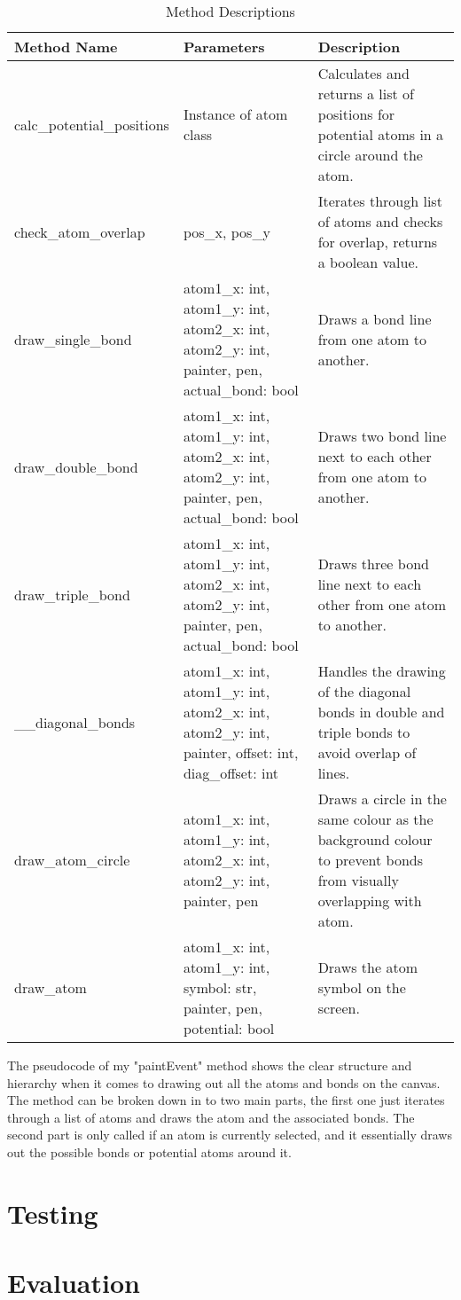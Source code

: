 \documentclass[a4paper,12pt]{article}
\begin{document}
\begin{table}[htbp]
    \centering
    \begin{tabularx}{\textwidth}{|X|X|X|}
        \hline
        \textbf{Method Name} & \textbf{Parameters} & \textbf{Description}\\
        \hline
        calc\_potential\_positions & Instance of atom class & Calculates and returns a list of positions for potential atoms in a circle around the atom. \\
        \hline
        check\_atom\_overlap & pos\_x, pos\_y & Iterates through list of atoms and checks for overlap, returns a boolean value. \\
        \hline
        draw\_single\_bond & atom1\_x: int, atom1\_y: int, atom2\_x: int, atom2\_y: int, painter, pen, actual\_bond: bool & Draws a bond line from one atom to another. \\
        \hline
        draw\_double\_bond & atom1\_x: int, atom1\_y: int, atom2\_x: int, atom2\_y: int, painter, pen, actual\_bond: bool & Draws two bond line next to each other from one atom to another. \\
        \hline
        draw\_triple\_bond & atom1\_x: int, atom1\_y: int, atom2\_x: int, atom2\_y: int, painter, pen, actual\_bond: bool & Draws three bond line next to each other from one atom to another. \\
        \hline
        \_\_diagonal\_bonds & atom1\_x: int, atom1\_y: int, atom2\_x: int, atom2\_y: int, painter, offset: int, diag\_offset: int & Handles the drawing of the diagonal bonds in double and triple bonds to avoid overlap of lines. \\
        \hline
        draw\_atom\_circle & atom1\_x: int, atom1\_y: int, atom2\_x: int, atom2\_y: int, painter, pen & Draws a circle in the same colour as the background colour to prevent bonds from visually overlapping with atom. \\
        \hline
        draw\_atom & atom1\_x: int, atom1\_y: int, symbol: str, painter, pen, potential: bool & Draws the atom symbol on the screen. \\
        \hline
    \end{tabularx}
    \caption{Method Descriptions}
    \label{tab:methods}
\end{table}

\newpage

The pseudocode of my "paintEvent" method shows the clear structure and hierarchy when it comes to drawing out all the atoms and bonds on the canvas. The method can be broken down in to two main parts, the first one just iterates through a list of atoms and draws the atom and the associated bonds. The second part is only called if an atom is currently selected, and it essentially draws out the possible bonds or potential atoms around it.


\newpage

\section{Testing}

\section{Evaluation}
\newpage
\end{document}
